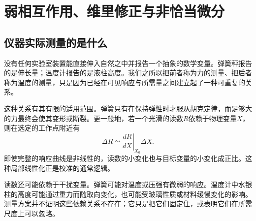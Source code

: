 \chapter{弱相互作用、维里修正与非恰当微分}


\section{仪器实际测量的是什么}

没有任何实验室装置能直接伸入自然之中并报告一个抽象的数学变量。弹簧秤报告的是伸长量；温度计报告的是液柱高度。我们之所以把前者称为力的测量、把后者称为温度的测量，只是因为已经在可见响应与所需量之间建立起了一种可重复的关系。

这种关系有其有限的适用范围。弹簧只有在保持弹性时才服从胡克定律，而足够大的力最终会使其变形或断裂。更一般地，若一个光滑的读数\(R\)依赖于物理变量\(X\)，则在选定的工作点附近有
\begin{equation}
 \Delta R \simeq
 \left.\frac{dR}{dX}\right|_{X_0}\Delta X.
 \label{eq:sm6-local-linear-response}
\end{equation}
即使完整的响应曲线是非线性的，读数的小变化也与目标变量的小变化成正比。这种局部线性化正是校准的通常逻辑。

读数还可能依赖于干扰变量。弹簧可能对温度或压强有微弱的响应。温度计中水银柱的高度可能通过重力而随取向变化，也可能受玻璃性质或材料缓慢变化的影响。测量方案并不证明这些依赖关系不存在；它只是把它们固定住，或表明它们在所需尺度上可以忽略。

\begin{classroomqa}
\end{classroomqa}

\begin{classroomqa}
\end{classroomqa}


